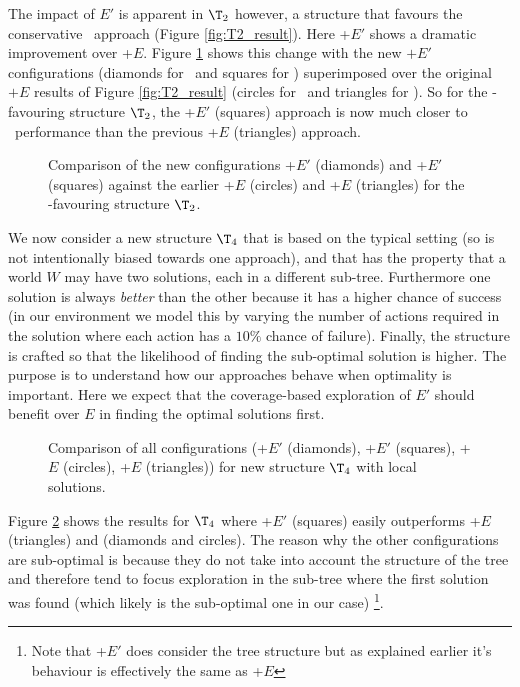 The impact of $E'$ is apparent in $\T_2$ however, a structure that
favours the conservative \BUL\ approach (Figure
\ref{fig:T2_result}). Here \CL+$E'$ shows a dramatic improvement over
\CL+$E$. Figure \ref{fig:T2_result2} shows this change with the new
$+E'$ configurations (diamonds for \BUL\ and squares for \CL)
superimposed over the original $+E$ results of Figure
\ref{fig:T2_result} (circles for \BUL\ and triangles for \CL). So for
the \BUL-favouring structure $\T_2$, the \CL+$E'$ (squares) approach
is now much closer to \BUL\ performance than the previous \CL+$E$
(triangles) approach. 

\begin{figure}[ht]
\begin{center}

\end{center}
\caption{Comparison of the new configurations \BUL+$E'$ (diamonds) and \CL+$E'$ (squares) against the earlier \BUL+$E$ (circles) and \CL+$E$ (triangles) for the \BUL-favouring structure $\T_2$.}
\label{fig:T2_result2}
\end{figure}

We now consider a new structure $\T_4$ that is based on the typical setting (so is not intentionally biased towards one approach), and that has the property that a world $W$ may have two solutions, each in a different sub-tree. Furthermore one solution is always \textit{better} than the other because it has a higher chance of success (in our environment we model this by varying the number of actions required in the solution where each action has a $10\%$ chance of failure). Finally, the structure is crafted so that the likelihood of finding the sub-optimal solution is higher. The purpose is to understand how our approaches behave when optimality is important. Here we expect that the coverage-based exploration of $E'$ should benefit over $E$ in finding the optimal solutions first. 

\begin{figure}[ht]
\begin{center}

\end{center}
\caption{Comparison of all configurations (\BUL+$E'$ (diamonds), \CL+$E'$ (squares), \BUL+$E$ (circles), \CL+$E$ (triangles)) for new structure $\T_4$ with local solutions.}
\label{fig:T4_result}
\end{figure}

Figure \ref{fig:T4_result} shows the results for $\T_4$ where \CL+$E'$ (squares) easily outperforms \CL+$E$ (triangles) and \BUL (diamonds and circles). The reason why the other configurations are sub-optimal is because they do not take into account the structure of the tree and therefore tend to focus exploration in the sub-tree where the first solution was found (which likely is the sub-optimal one in our case) \footnote{Note that \BUL+$E'$ does consider the tree structure but as explained earlier it's behaviour is effectively the same as \BUL+$E$}.


